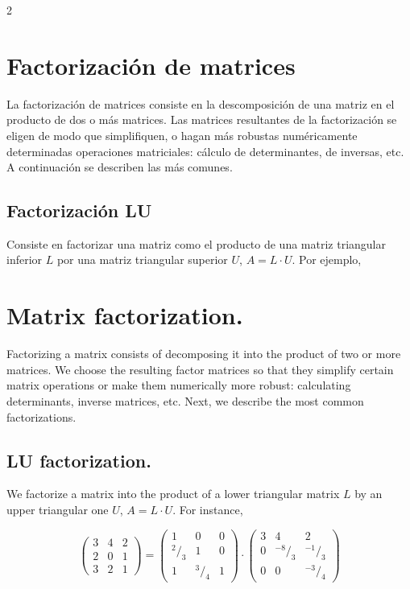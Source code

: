\begin{paracol}{2}
\section{Factorización de matrices}\label{sec:fact}
La factorización de matrices consiste en la descomposición de una matriz en el producto de dos o más matrices. Las matrices resultantes de la factorización se eligen de modo que simplifiquen, o hagan más robustas numéricamente determinadas operaciones matriciales: cálculo de determinantes, de inversas, etc. A continuación se describen las más comunes.

\subsection{Factorización LU}\label{sec:LU}
Consiste en factorizar una matriz como el producto de una matriz triangular inferior $L$ por una  matriz triangular superior $U$, $A=L\cdot U$. Por ejemplo,

\switchcolumn

\section{Matrix factorization.}
Factorizing a matrix consists of decomposing it into the product of two or more matrices. We choose the resulting factor matrices so that they simplify certain matrix operations or make them numerically more robust: calculating determinants, inverse matrices, etc. Next, we describe the most common factorizations.

\subsection{LU factorization.}
We factorize a matrix into the product of a lower triangular matrix $L$ by an upper triangular one $U$, $A=L\cdot U$. For instance, 

\end{paracol}
\begin{equation*}
\begin{pmatrix}
3& 4& 2\\
2& 0& 1\\
3& 2& 1
\end{pmatrix} = \begin{pmatrix}
1& 0& 0\\
^2/_3 & 1& 0\\
1& ^3/_4& 1
\end{pmatrix}\cdot \begin{pmatrix}
3& 4& 2\\
0& ^{-8}/_3& ^{-1}/_3\\
0& 0& ^{-3}/_4
\end{pmatrix}
\end{equation*}
